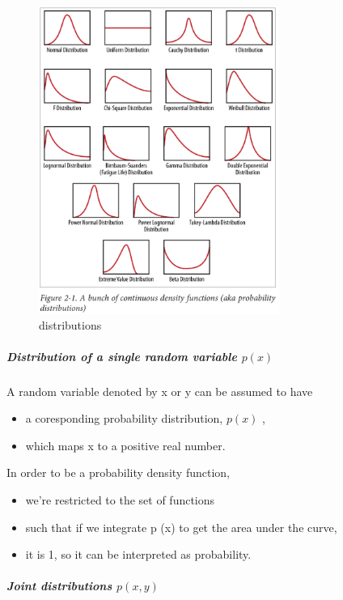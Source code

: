\documentclass[]{article}
\providecommand{\tightlist}{%
  \setlength{\itemsep}{0pt}\setlength{\parskip}{0pt}}
\let\oldsubparagraph\subparagraph
\renewcommand{\subparagraph}[1]{\oldsubparagraph{#1}\mbox{}}
\begin{document}
\begin{figure}
\centering
\includegraphics[width=0.70000\textwidth]{figs/9a-2.png}
\caption{distributions}
\end{figure}

\subparagraph{\texorpdfstring{Distribution of a single random variable
\(p(x)\)}{Distribution of a single random variable p(x)}}\label{distribution-of-a-single-random-variable-px}

A random variable denoted by x or y can be assumed to have

\begin{itemize}
\tightlist
\item
  a coresponding probability distribution, \(p(x)\) ,
\item
  which maps x to a positive real number.
\end{itemize}

In order to be a probability density function,

\begin{itemize}
\tightlist
\item
  we're restricted to the set of functions
\item
  such that if we integrate p (x) to get the area under the curve,
\item
  it is 1, so it can be interpreted as probability.
\end{itemize}

\subparagraph{\texorpdfstring{Joint distributions
\(p(x,y)\)}{Joint distributions p(x,y)}}\label{joint-distributions-pxy}
\end{document}
